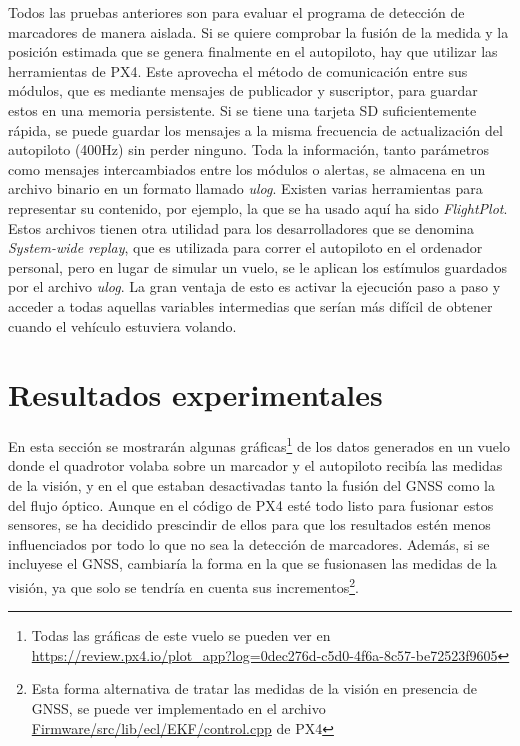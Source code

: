 Todos las pruebas anteriores son para evaluar el programa de detección de marcadores de manera aislada. Si se quiere comprobar la fusión de la medida y la posición estimada que se genera finalmente en el autopiloto, hay que utilizar las herramientas de PX4. Este aprovecha el método de comunicación entre sus módulos, que es mediante mensajes de publicador y suscriptor, para guardar estos en una memoria persistente. Si se tiene una tarjeta SD suficientemente rápida, se puede guardar los mensajes a la misma frecuencia de actualización del autopiloto (400Hz) sin perder ninguno. 
Toda la información, tanto parámetros como mensajes intercambiados entre los módulos o alertas, se almacena en un archivo binario en un formato llamado \textit{ulog}. Existen varias herramientas para representar su contenido, por ejemplo, la que se ha usado aquí ha sido \textit{FlightPlot}. Estos archivos tienen otra utilidad para los desarrolladores que se denomina \textit{System-wide replay}, que es utilizada para correr el autopiloto en el ordenador personal, pero en lugar de simular un vuelo, se le aplican los estímulos guardados por el archivo \textit{ulog}. La gran ventaja de esto es activar la ejecución paso a paso y acceder a todas aquellas variables intermedias que serían más difícil de obtener cuando el vehículo estuviera volando.


\section{Resultados experimentales}
En esta sección se mostrarán algunas gráficas\footnote{Todas las gráficas de este vuelo se pueden ver en \url{https://review.px4.io/plot\_app?log=0dec276d-c5d0-4f6a-8c57-be72523f9605}} de los datos generados en un vuelo donde el quadrotor volaba sobre un marcador y el autopiloto recibía las medidas de la visión, y en el que estaban desactivadas tanto la fusión del GNSS como la del flujo óptico. Aunque en el código de PX4 esté todo listo para fusionar estos sensores, se ha decidido prescindir de ellos para que los resultados estén menos influenciados por todo lo que no sea la detección de marcadores. Además, si se incluyese el GNSS, cambiaría la forma en la que se fusionasen las medidas de la visión, ya que solo se tendría en cuenta sus incrementos\footnote{Esta forma alternativa de tratar las medidas de la visión en presencia de GNSS, se puede ver implementado en el archivo \href{https://github.com/PX4/PX4-ECL/blob/ec934908900b23ee273d1a9f82364b7b38423200/EKF/control.cpp\#L248}{Firmware/src/lib/ecl/EKF/control.cpp} de PX4}.

